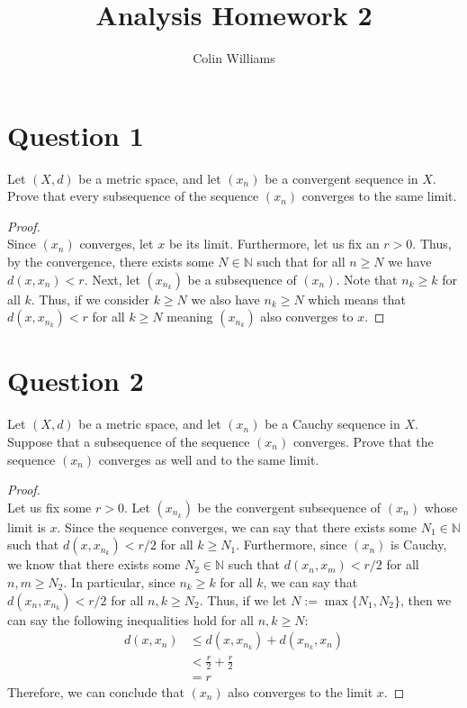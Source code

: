 \documentclass[10pt,a4paper]{article}
\title{Analysis Homework 2}
\author{Colin Williams}
\theoremstyle{definition}
\theoremstyle{definition}
\begin{document}
\maketitle

\section*{Question 1}
Let $(X, d)$ be a metric space, and let $(x_n)$ be a convergent sequence in $X$. Prove that every subsequence of the sequence $(x_n)$ converges to the same limit. 

\begin{proof}$ $
\\Since $(x_n)$ converges, let $x$ be its limit. Furthermore, let us fix an $r > 0$. Thus, by the convergence, there exists some $N \in \mathbb{N}$ such that for all $n \geq N$ we have $d(x, x_n) < r$. Next, let $(x_{n_k})$ be a subsequence of $(x_n)$. Note that $n_k \geq k$ for all $k$. Thus, if we consider $k \geq N$ we also have $n_k \geq N$ which means that $d(x, x_{n_k}) < r$ for all $k \geq N$ meaning $(x_{n_k})$ also converges to $x$. 
\end{proof}

\section*{Question 2}
Let $(X, d)$ be a metric space, and let $(x_n)$ be a Cauchy sequence in $X$. Suppose that a subsequence of the sequence $(x_n)$ converges. Prove that the sequence $(x_n)$ converges as well and to the same limit. 

\begin{proof}$ $
\\Let us fix some $r > 0$. Let $(x_{n_k})$ be the convergent subsequence of $(x_n)$ whose limit is $x$. Since the sequence converges, we can say that there exists some $N_1 \in \mathbb{N}$ such that $d(x, x_{n_k}) < r/2$ for all $k \geq N_1$. Furthermore, since $(x_n)$ is Cauchy, we know that there exists some $N_2 \in \mathbb{N}$ such that $d(x_n, x_m) < r/2$ for all $n, m \geq N_2$. In particular, since $n_k \geq k$ for all $k$, we can say that $d(x_n, x_{n_k}) < r/2$ for all $n, k \geq N_2$. Thus, if we let $N := \max\{N_1, N_2\}$, then we can say the following inequalities hold for all $n, k \geq N$:
\begin{align*}
d(x, x_n) &\leq d(x, x_{n_k}) + d(x_{n_k}, x_n)\\
&< \frac{r}{2} + \frac{r}{2}\\
&= r
\end{align*}
Therefore, we can conclude that $(x_n)$ also converges to the limit $x$. 
\end{proof}
\end{document}
